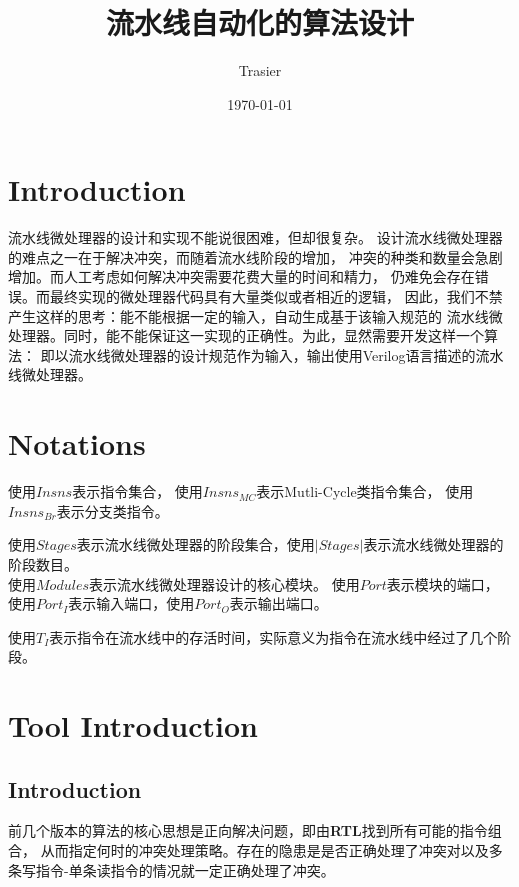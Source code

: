 \documentclass[hyperref,UTF8]{ctexart}
\theoremstyle{definition}
\theoremstyle{remark}
\numberwithin{equation}{subsection}
\newcommand{\Emph}{\textbf}
\begin{document}
\title{\Huge 流水线自动化的算法设计}
\vspace{2cm}
\author{\Large Trasier}
\date{\today}
\maketitle


\section{Introduction}
\label{sec:intro}
	
	流水线微处理器的设计和实现不能说很困难，但却很复杂。
	设计流水线微处理器的难点之一在于解决冲突，而随着流水线阶段的增加，
	冲突的种类和数量会急剧增加。而人工考虑如何解决冲突需要花费大量的时间和精力，
	仍难免会存在错误。而最终实现的微处理器代码具有大量类似或者相近的逻辑，
	因此，我们不禁产生这样的思考：能不能根据一定的输入，自动生成基于该输入规范的
	流水线微处理器。同时，能不能保证这一实现的正确性。为此，显然需要开发这样一个算法：
	即以流水线微处理器的设计规范作为输入，输出使用Verilog语言描述的流水线微处理器。
	

\section{Notations}
\label{sec:notation}
	
	使用$Insns$表示指令集合，
	使用$Insns_{MC}$表示Mutli-Cycle类指令集合，
	使用$Insns_{Br}$表示分支类指令。
	
	使用$Stages$表示流水线微处理器的阶段集合，使用$|Stages|$表示流水线微处理器的阶段数目。	\\
	
	使用$Modules$表示流水线微处理器设计的核心模块。
	使用$Port$表示模块的端口，使用$Port_I$表示输入端口，使用$Port_O$表示输出端口。
	
	使用$T_I$表示指令在流水线中的存活时间，实际意义为指令在流水线中经过了几个阶段。
	

\section{Tool Introduction}
\label{sec:ppc_algov5}

\subsection{Introduction}
	
	前几个版本的算法的核心思想是正向解决问题，即由\Emph{RTL}找到所有可能的指令组合，
	从而指定何时的冲突处理策略。存在的隐患是是否正确处理了冲突对以及多条写指令-单条读指令的情况就一定正确处理了冲突。
	
\end{document}
